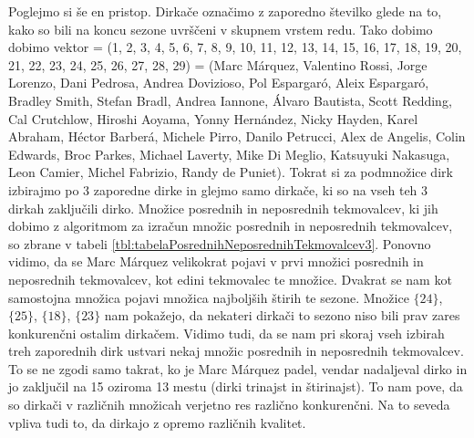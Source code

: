 \documentclass[a4paper, 12pt]{book}
\begin{document}
Poglejmo si še en pristop. Dirkače označimo z zaporedno številko glede na to, kako so bili na koncu sezone uvrščeni v skupnem vrstem redu. Tako dobimo dobimo vektor = (1, 2, 3, 4, 5, 6, 7, 8, 9, 10, 11, 12, 13, 14, 15, 16, 17, 18, 19, 20, 21, 22, 23, 24, 25, 26, 27, 28, 29) = (Marc Márquez, Valentino Rossi, Jorge Lorenzo, Dani Pedrosa, Andrea Dovizioso, Pol Espargaró, Aleix Espargaró, Bradley Smith, Stefan Bradl, Andrea Iannone, Álvaro Bautista, Scott Redding, Cal Crutchlow, Hiroshi Aoyama, Yonny Hernández, Nicky Hayden, Karel Abraham, Héctor Barberá, Michele Pirro, Danilo Petrucci, Alex de Angelis, Colin Edwards, Broc Parkes, Michael Laverty, Mike Di Meglio, Katsuyuki Nakasuga, Leon Camier, Michel Fabrizio, Randy de Puniet). Tokrat si za podmnožice dirk izbirajmo po 3 zaporedne dirke in glejmo samo dirkače, ki so na vseh teh 3 dirkah zaključili dirko. Množice posrednih in neposrednih tekmovalcev, ki jih dobimo z algoritmom za izračun množic posrednih in neposrednih tekmovalcev, so zbrane v tabeli \ref{tbl:tabelaPosrednihNeposrednihTekmovalcev3}. Ponovno vidimo, da se Marc Márquez velikokrat pojavi v prvi množici posrednih in neposrednih tekmovalcev, kot edini tekmovalec te množice. Dvakrat se nam kot samostojna množica pojavi množica najboljših štirih te sezone. Množice $\{ 24 \}$, $\{ 25 \}$, $\{ 18 \}$, $\{ 23 \}$ nam pokažejo, da nekateri dirkači to sezono niso bili prav zares konkurenčni ostalim dirkačem. Vidimo tudi, da se nam pri skoraj vseh izbirah treh zaporednih dirk ustvari nekaj množic posrednih in neposrednih tekmovalcev. To se ne zgodi samo takrat, ko je Marc Márquez padel, vendar nadaljeval dirko in jo zaključil na 15 oziroma 13 mestu (dirki trinajst in štirinajst). To nam pove, da so dirkači v različnih množicah verjetno res različno konkurenčni. Na to seveda vpliva tudi to, da dirkajo z opremo različnih kvalitet. 
\end{document}
